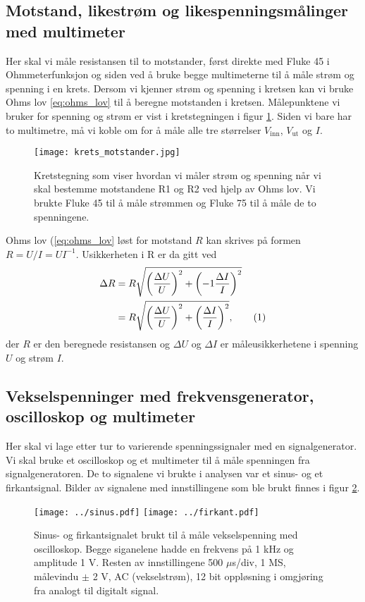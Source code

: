 \documentclass[reprint, english,notitlepage]{revtex4-1}  %
\newcommand\numberthis{\addtocounter{equation}{1}\tag{\theequation}}
\begin{document}
\subsection{Motstand, likestrøm og likespenningsmålinger med multimeter}
Her skal vi måle resistansen til to motstander, først direkte med Fluke 45 i Ohmmeterfunksjon og siden ved å bruke begge multimeterne til å måle strøm og spenning i en krets. Dersom vi kjenner strøm og spenning i kretsen kan vi bruke Ohms lov \ref{eq:ohms_lov} til å beregne motstanden i kretsen. Målepunktene vi bruker for spenning og strøm er vist i kretstegningen i figur \ref{fig:krets_motstander}. Siden vi bare har to multimetre, må vi koble om for å måle alle tre størrelser $V_{\text{inn}}$, $V_{\text{ut}}$ og $I$.
\begin{figure}
  \texttt{[image: krets\_motstander.jpg]}
  \caption{Kretstegning som viser hvordan vi måler strøm og spenning når vi skal bestemme motstandene R1 og R2 ved hjelp av Ohms lov. Vi brukte Fluke 45 til å måle strømmen og Fluke 75 til å måle de to spenningene.}
  \label{fig:krets_motstander}
\end{figure}

Ohms lov (\ref{eq:ohms_lov} løst for motstand $R$ kan skrives på formen $R = U/I = U I^{-1}$. Usikkerheten i R er da gitt ved
\begin{align*}
  \Delta R &= R \sqrt{\left( \frac{\Delta U}{U} \right) ^2 + \left( -1 \frac{\Delta I}{I} \right) ^2} \\
  &= R \sqrt{\left( \frac{\Delta U}{U} \right) ^2 + \left( \frac{\Delta I}{I} \right) ^2}, \numberthis \label{eq:usikkerhet_R}
\end{align*}
der $R$ er den beregnede resistansen og $\Delta U$ og $\Delta I$ er måleusikkerhetene i spenning $U$ og strøm $I$.


\subsection{Vekselspenninger med frekvensgenerator, oscilloskop og multimeter}
Her skal vi lage etter tur to varierende spenningssignaler med en signalgenerator. Vi skal bruke et oscilloskop og et multimeter til å måle spenningen fra signalgeneratoren. De to signalene vi brukte i analysen var et sinus- og et firkantsignal. Bilder av signalene med innstillingene som ble brukt finnes i figur \ref{fig:inputsignaler}.

\begin{figure}
  \texttt{[image: ../sinus.pdf]}
  \texttt{[image: ../firkant.pdf]}
  \caption{Sinus- og firkantsignalet brukt til å måle vekselspenning med oscilloskop. Begge siganelene hadde en frekvens på 1 kHz og amplitude 1 V. Resten av innstillingene 500 $\mu$s/div, 1 MS, målevindu $\pm$ 2 V, AC (vekselstrøm), 12 bit oppløsning i omgjøring fra analogt til digitalt signal.}
  \label{fig:inputsignaler}
\end{figure}
\end{document}

